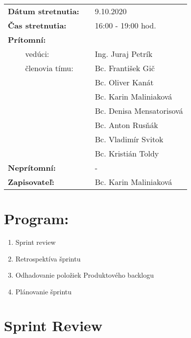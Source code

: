 \documentclass{article}
\begin{document}
    

    \begin{table}[h]
        \begin{tabular}{lllll}
            \multicolumn{3}{l}{\textbf{Dátum stretnutia:}} & & 9.10.2020 \\
            \multicolumn{3}{l}{\textbf{Čas stretnutia:}} & & 16:00 - 19:00 hod. \\
            \multicolumn{3}{l}{\textbf{Prítomní:}} \\
            & & vedúci: & & Ing. Juraj Petrík \\
            & & členovia tímu: & & Bc. František Gič  \\
            & & & & Bc. Oliver Kanát \\
            & & & & Bc. Karin Maliniaková \\
            & & & & Bc. Denisa Mensatorisová \\
            & & & & Bc. Anton Rusňák \\
            & & & & Bc. Vladimír Svitok \\
            & & & & Bc. Kristián Toldy \\
            \multicolumn{3}{l}{\textbf{Neprítomní:}} & & -\\
            \multicolumn{3}{l}{\textbf{Zapisovateľ:}} & & Bc. Karin Maliniaková \\
        \end{tabular}
        \label{tab:grades}
    \end{table}

    \section*{Program:}

    \begin{enumerate}
        \item Sprint review
        \item Retrospektíva šprintu
        \item Odhadovanie položiek Produktového backlogu
        \item Plánovanie šprintu
    \end{enumerate}

    \section*{Sprint Review}
\end{document}
